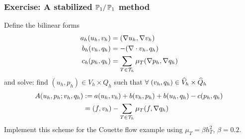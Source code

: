 \begin{frame}
    \frametitle{Exercise: A stabilized $\mathbb{P}_1/\,\mathbb{P}_1$ method}
    Define  the bilinear forms
    \begin{align*}
        a_h(u_h,v_h) &= (\nabla u_h, \nabla v_h)  \\
        b_h(v_h,q_h) &= -(\nabla \cdot v_h, q_h)  \\
        c_h(p_h,q_h) &= \sum_{T \in \mathcal{T}_h}\mu_T(\nabla p_h, \nabla
        q_h)
    \end{align*}
    and solve: find $(u_h,p_h) \in V_h \times Q_h$
    such that $\forall \; (v_h,q_h) \in \widehat{V}_h \times \widehat{Q}_h$
    \begin{align*}
        A(u_h,p_h;v_h,q_h) &:= a(u_h,v_h) + b(v_h,p_h) + b(u_h,q_h) -
        c(p_h,q_h)
        \\
        &= (f,v_h) - \sum_{T \in \mathcal{T}_h}\mu_T (f,\nabla q_h)
    \end{align*}
    Implement this scheme for the Couette flow example using
    $\mu_T = \beta h_T^2$, $\beta = 0.2$.
\end{frame}

